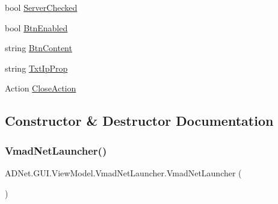 \begin{DoxyCompactItemize}
\item 
bool \hyperlink{class_a_d_net_1_1_g_u_i_1_1_view_model_1_1_vmad_net_launcher_ad55a76ef59d2c0d696946cc2cea3ea8a}{Server\+Checked}
\item 
bool \hyperlink{class_a_d_net_1_1_g_u_i_1_1_view_model_1_1_vmad_net_launcher_a7b1b0f38c061e9c14829b03b9bb7a263}{Btn\+Enabled}
\item 
string \hyperlink{class_a_d_net_1_1_g_u_i_1_1_view_model_1_1_vmad_net_launcher_a4cb44fd02ec686ea308719ac2773a656}{Btn\+Content}
\item 
string \hyperlink{class_a_d_net_1_1_g_u_i_1_1_view_model_1_1_vmad_net_launcher_aa73995de7f609e92bdbc6f90eccc9e65}{Txt\+Ip\+Prop}
\item 
Action \hyperlink{class_a_d_net_1_1_g_u_i_1_1_view_model_1_1_vmad_net_launcher_a284136f3347629a63a9b209ed06f38df}{Close\+Action}
\end{DoxyCompactItemize}


\subsection{Constructor \& Destructor Documentation}
\mbox{\label{class_a_d_net_1_1_g_u_i_1_1_view_model_1_1_vmad_net_launcher_a284a16f14d571b282b2ea3e210421911}} 
\subsubsection{\texorpdfstring{Vmad\+Net\+Launcher()}{VmadNetLauncher()}}
{\footnotesize\ttfamily A\+D\+Net.\+G\+U\+I.\+View\+Model.\+Vmad\+Net\+Launcher.\+Vmad\+Net\+Launcher (\begin{DoxyParamCaption}{ }\end{DoxyParamCaption})}



